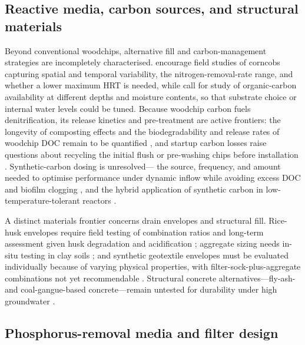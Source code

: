 \documentclass[11pt]{article}
\begin{document}
\subsection{Reactive media, carbon sources, and structural materials}

Beyond conventional woodchips, alternative fill and carbon-management strategies
are incompletely characterised. \textcite{Law2023} encourage field studies of
corncobs capturing spatial and temporal variability, the nitrogen-removal-rate
range, and whether a lower maximum HRT is needed, while
\textcite{Porter2015} call for study of organic-carbon availability at different
depths and moisture contents, so that substrate choice or internal water levels
could be tuned. Because woodchip carbon fuels denitrification, its release
kinetics and pre-treatment are active frontiers: the longevity of
composting effects and the biodegradability and release rates of woodchip DOC
remain to be quantified \parencite{Kouanda2021}, and startup carbon losses raise
questions about recycling the initial flush or pre-washing chips before
installation \parencite{Abusallout2017}. Synthetic-carbon dosing is unresolved---
the source, frequency, and amount needed to optimise performance under dynamic
inflow while avoiding excess DOC and biofilm clogging \parencite{Rivas2020}, and
the hybrid application of synthetic carbon in low-temperature-tolerant reactors
\parencite{Zhang2021b}.

A distinct materials frontier concerns drain envelopes and structural fill.
Rice-husk envelopes require field testing of combination ratios and long-term
assessment given husk degradation and acidification
\parencite{Kaboosi2012,Navabian2017}; aggregate sizing needs in-situ testing in
clay soils \parencite{Byrne2023}; and synthetic geotextile envelopes must be
evaluated individually because of varying physical properties, with
filter-sock-plus-aggregate combinations not yet recommendable
\parencite{Byrne2023b}. Structural concrete alternatives---fly-ash- and
coal-gangue-based concrete---remain untested for durability under high
groundwater \parencite{Wang2016c}.

\subsection{Phosphorus-removal media and filter design}
\end{document}
